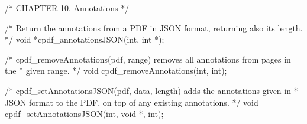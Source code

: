 /* CHAPTER 10. Annotations */

/* Return the annotations from a PDF in JSON format, returning also its length.
 */
void *cpdf_annotationsJSON(int, int *);

/* cpdf_removeAnnotations(pdf, range) removes all annotations from pages in the
 * given range. */
void cpdf_removeAnnotations(int, int);

/* cpdf_setAnnotationsJSON(pdf, data, length) adds the annotations given in
 * JSON format to the PDF, on top of any existing annotations. */
void cpdf_setAnnotationsJSON(int, void *, int);

